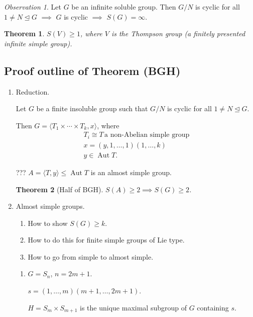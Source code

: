 \documentclass[svgnames]{article}
\newtheorem{Theorem}{Theorem}
\theoremstyle{definition}
\theoremstyle{remark}
\newtheorem{Observation}{Observation}
\DeclareMathOperator{\Aut}{Aut}
\begin{document}
\begin{Observation}
Let $G$ be an infinite soluble group. Then $G/N$ is cyclic for all $1 \ne N \unlhd G$ $\implies$ $G$ is cyclic $\implies$ $S(G) = \infty$.
\end{Observation}

\begin{Theorem}
$S(V) \ge 1$, where $V$ is the Thompson group (a finitely presented infinite simple group).
\end{Theorem}

\subsection{Proof outline of Theorem (BGH)}
\begin{enumerate}
\item Reduction.

Let $G$ be a finite insoluble group such that $G/N$ is cyclic for all $1 \ne N \unlhd G$.

Then $G = \langle T_1 \times \cdots \times T_k, x \rangle$, where
\begin{align*}
	T_i \cong T\, \text{a non-Abelian simple group} \\
	x = (y, 1, \ldots, 1)(1, \ldots, k) \\
	y \in \Aut T.
\end{align*}

??? $A = \langle T, y \rangle \le \Aut T$ is an almost simple group.

\begin{Theorem}[Half of BGH]
$S(A) \ge 2 \implies S(G) \ge 2$.
\end{Theorem}

\item Almost simple groups.
\begin{enumerate}[label=(\alph*)]
	\item How to show $S(G) \ge k$.
	\item How to do this for finite simple groups of Lie type.
	\item How to go from simple to almost simple.
\end{enumerate}
\begin{enumerate}[label=(\alph*)]
	\item $G = S_n$, $n = 2m + 1$.
	
	$s = (1, \ldots, m)(m + 1, \ldots, 2m + 1)$.
	
	$H = S_m \times S_{m + 1}$ is the unique maximal subgroup of $G$ containing $s$.
	

\end{enumerate}
\end{enumerate}
\end{document}
